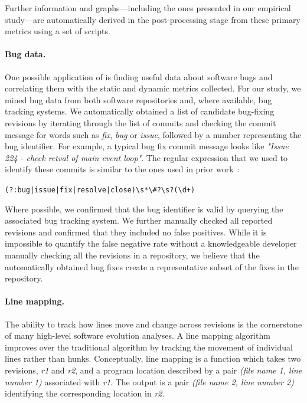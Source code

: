 Further information and graphs---including the ones presented in our
empirical study---are automatically derived in the post-processing
stage from these primary metrics using a set of scripts.




\paragraph{Bug data.} One possible application of \covrig is finding
useful data about software bugs and correlating them with the static
and dynamic metrics collected. For our study, we mined bug data from
both software repositories and, where available, bug tracking systems.
We automatically obtained a list of candidate bug-fixing revisions by
iterating through the list of commits and checking the commit message
for words such as {\em fix}, {\em bug} or {\em issue}, followed by a
number representing the bug identifier.  For example, a typical
\memcached bug fix commit message looks like {\em "Issue 224 - check
  retval of main event loop"}. The regular expression that we used to
identify these commits is similar to the ones used in prior
work~\cite{genealogies:issre13}:

\lstinline`(?:bug|issue|fix|resolve|close)\s*\#?\s?(\d+)`

Where possible, we confirmed that the bug identifier is valid by
querying the associated bug tracking system. We further manually
checked all reported revisions and confirmed that they included no
false positives.  While it is impossible to quantify the false
negative rate without a knowledgeable developer manually checking all
the revisions in a repository, we believe that the automatically
obtained bug fixes create a representative subset of the fixes in the
repository.

\paragraph{Line mapping.} The ability to track how lines move and change
across revisions is the cornerstone of many high-level software
evolution analyses.  A line mapping algorithm improves over the
traditional \diff algorithm by tracking the movement of individual
lines rather than hunks.  Conceptually, line mapping is a function
which takes two revisions, \textit{r1} and \textit{r2}, and a program
location described by a pair \textit{(file name 1, line number 1)}
associated with \textit{r1}.  The output is a pair \textit{(file name
  2, line number 2)} identifying the corresponding location in
\textit{r2}.

